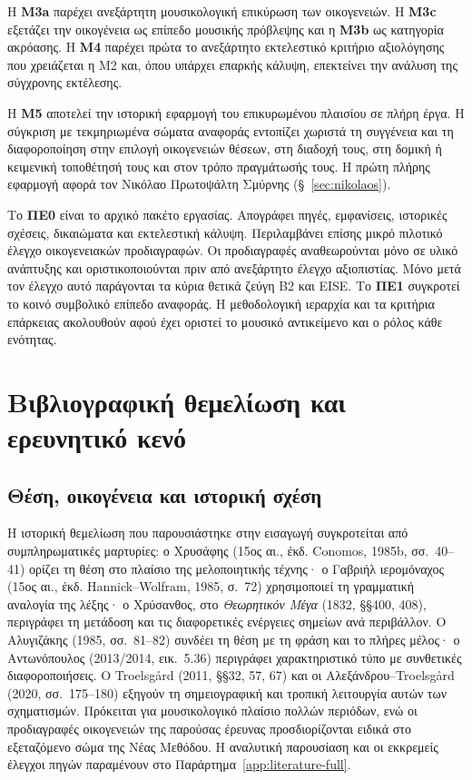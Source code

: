 \documentclass[11pt,a4paper]{article}
\begin{document}
Η \textbf{M3a} παρέχει ανεξάρτητη μουσικολογική επικύρωση των οικογενειών. Η \textbf{M3c} εξετάζει την οικογένεια ως επίπεδο μουσικής πρόβλεψης και η \textbf{M3b} ως κατηγορία ακρόασης. Η \textbf{M4} παρέχει πρώτα το ανεξάρτητο εκτελεστικό κριτήριο αξιολόγησης που χρειάζεται η M2 και, όπου υπάρχει επαρκής κάλυψη, επεκτείνει την ανάλυση της σύγχρονης εκτέλεσης.

Η \textbf{M5} αποτελεί την ιστορική εφαρμογή του επικυρωμένου πλαισίου σε πλήρη έργα. Η σύγκριση με τεκμηριωμένα σώματα αναφοράς εντοπίζει χωριστά τη συγγένεια και τη διαφοροποίηση στην επιλογή οικογενειών θέσεων, στη διαδοχή τους, στη δομική ή κειμενική τοποθέτησή τους και στον τρόπο πραγμάτωσής τους. Η πρώτη πλήρης εφαρμογή αφορά τον Νικόλαο Πρωτοψάλτη Σμύρνης (§~\ref{sec:nikolaos}).

Το \textbf{ΠΕ0} είναι το αρχικό πακέτο εργασίας. Απογράφει πηγές, εμφανίσεις, ιστορικές σχέσεις, δικαιώματα και εκτελεστική κάλυψη. Περιλαμβάνει επίσης μικρό πιλοτικό έλεγχο οικογενειακών προδιαγραφών. Οι προδιαγραφές αναθεωρούνται μόνο σε υλικό ανάπτυξης και οριστικοποιούνται πριν από ανεξάρτητο έλεγχο αξιοπιστίας. Μόνο μετά τον έλεγχο αυτό παράγονται τα κύρια θετικά ζεύγη B2 και EISE. Το \textbf{ΠΕ1} συγκροτεί το κοινό συμβολικό επίπεδο αναφοράς. Η μεθοδολογική ιεραρχία και τα κριτήρια επάρκειας ακολουθούν αφού έχει οριστεί το μουσικό αντικείμενο και ο ρόλος κάθε ενότητας.

\section{Βιβλιογραφική θεμελίωση και ερευνητικό κενό}
\subsection{Θέση, οικογένεια και ιστορική σχέση}

Η ιστορική θεμελίωση που παρουσιάστηκε στην εισαγωγή συγκροτείται από συμπληρωματικές μαρτυρίες: ο Χρυσάφης (15ος αι., έκδ. Conomos, 1985b, σσ.~40--41) ορίζει τη θέση στο πλαίσιο της μελοποιητικής τέχνης· ο Γαβριήλ ιερομόναχος (15ος αι., έκδ. Hannick--Wolfram, 1985, σ.~72) χρησιμοποιεί τη γραμματική αναλογία της λέξης· ο Χρύσανθος, στο \emph{Θεωρητικόν Μέγα} (1832, §§400, 408), περιγράφει τη μετάδοση και τις διαφορετικές ενέργειες σημείων ανά περιβάλλον. Ο Αλυγιζάκης (1985, σσ.~81--82) συνδέει τη θέση με τη φράση και το πλήρες μέλος· ο Αντωνόπουλος (2013/2014, εικ.~5.36) περιγράφει χαρακτηριστικό τύπο με συνθετικές διαφοροποιήσεις. Ο Troelsgård (2011, §§32, 57, 67) και οι Αλεξάνδρου--Troelsgård (2020, σσ.~175--180) εξηγούν τη σημειογραφική και τροπική λειτουργία αυτών των σχηματισμών. Πρόκειται για μουσικολογικό πλαίσιο πολλών περιόδων, ενώ οι προδιαγραφές οικογενειών της παρούσας έρευνας προσδιορίζονται ειδικά στο εξεταζόμενο σώμα της Νέας Μεθόδου. Η αναλυτική παρουσίαση και οι εκκρεμείς έλεγχοι πηγών παραμένουν στο Παράρτημα~\ref{app:literature-full}.
\end{document}
